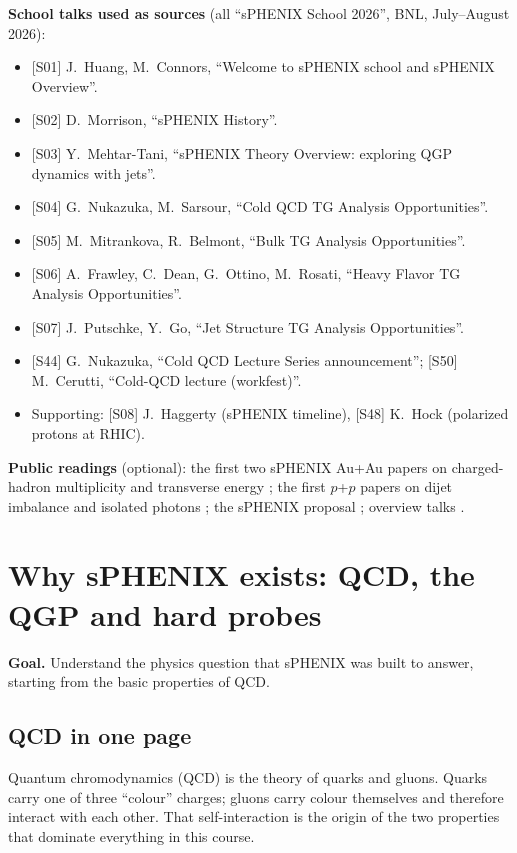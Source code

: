 \documentclass[11pt,letterpaper]{article}
\newcommand{\goal}[1]{\noindent\textbf{Goal.} #1\par}
\begin{document}
\noindent\textbf{School talks used as sources} (all ``sPHENIX School 2026'', BNL, July--August 2026):
\begin{itemize}
\item {[S01]} J.\ Huang, M.\ Connors, ``Welcome to sPHENIX school and sPHENIX Overview''.
\item {[S02]} D.\ Morrison, ``sPHENIX History''.
\item {[S03]} Y.\ Mehtar-Tani, ``sPHENIX Theory Overview: exploring QGP dynamics with jets''.
\item {[S04]} G.\ Nukazuka, M.\ Sarsour, ``Cold QCD TG Analysis Opportunities''.
\item {[S05]} M.\ Mitrankova, R.\ Belmont, ``Bulk TG Analysis Opportunities''.
\item {[S06]} A.\ Frawley, C.\ Dean, G.\ Ottino, M.\ Rosati, ``Heavy Flavor TG Analysis Opportunities''.
\item {[S07]} J.\ Putschke, Y.\ Go, ``Jet Structure TG Analysis Opportunities''.
\item {[S44]} G.\ Nukazuka, ``Cold QCD Lecture Series announcement''; {[S50]} M.\ Cerutti, ``Cold-QCD lecture (workfest)''.
\item Supporting: {[S08]} J.\ Haggerty (sPHENIX timeline), {[S48]} K.\ Hock (polarized protons at RHIC).
\end{itemize}
\textbf{Public readings} (optional): the first two sPHENIX Au+Au papers on charged-hadron multiplicity
\cite{bulk1} and transverse energy \cite{bulk2}; the first $p$+$p$ papers on dijet imbalance \cite{dijet} and isolated
photons \cite{isogamma}; the sPHENIX proposal \cite{proposal}; overview talks \cite{nouicer,roland}.

\section{Why sPHENIX exists: QCD, the QGP and hard probes}\label{sec:why}
\goal{Understand the physics question that sPHENIX was built to answer, starting from the basic properties of QCD.}

\subsection{QCD in one page}
Quantum chromodynamics (QCD) is the theory of quarks and gluons. Quarks carry one of three ``colour'' charges; gluons
carry colour themselves and therefore interact with each other. That self-interaction is the origin of the two
properties that dominate everything in this course.
\end{document}
